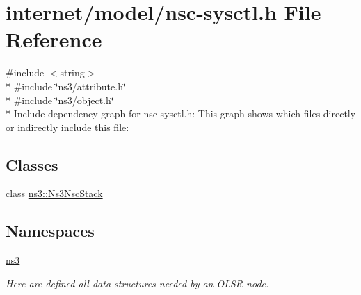 \hypertarget{nsc-sysctl_8h}{}\section{internet/model/nsc-\/sysctl.h File Reference}
\label{nsc-sysctl_8h}
{\ttfamily \#include $<$string$>$}\\*
{\ttfamily \#include \char`\"{}ns3/attribute.\+h\char`\"{}}\\*
{\ttfamily \#include \char`\"{}ns3/object.\+h\char`\"{}}\\*
Include dependency graph for nsc-\/sysctl.h\+:
This graph shows which files directly or indirectly include this file\+:
\subsection*{Classes}
\begin{DoxyCompactItemize}
\item 
class \hyperlink{classns3_1_1Ns3NscStack}{ns3\+::\+Ns3\+Nsc\+Stack}
\end{DoxyCompactItemize}
\subsection*{Namespaces}
\begin{DoxyCompactItemize}
\item 
 \hyperlink{namespacens3}{ns3}
\begin{DoxyCompactList}\small\item\em Here are defined all data structures needed by an O\+L\+SR node. \end{DoxyCompactList}\end{DoxyCompactItemize}
